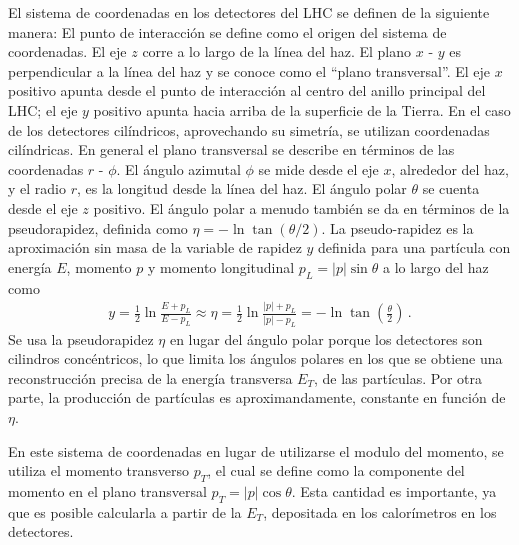 El sistema de coordenadas en los detectores del LHC se definen de la siguiente manera: 
El punto de interacción se define como el origen del sistema de coordenadas. El eje $z$ corre a lo largo de la línea del haz. El plano $x$ - $y$ es perpendicular a la línea del haz y se conoce como el \textquotedblleft plano transversal\textquotedblright. El eje $x$ positivo apunta desde el punto de interacción al centro del anillo principal del LHC; el eje $y$ positivo apunta hacia arriba de la superficie de la Tierra. En el caso de los detectores cilíndricos, aprovechando su simetría, se utilizan coordenadas cilíndricas. En general el plano transversal se describe en términos de las coordenadas $r$ - $\phi$. El ángulo azimutal $\phi$ se mide desde el eje $x$, alrededor del haz, y el radio $r$, es la longitud desde la línea del haz. El ángulo polar $\theta$ se cuenta desde el eje $z$ positivo. El ángulo polar a menudo también se da en términos de la pseudorapidez, definida como $\eta = -\ln \tan (\theta/2)$.
La pseudo-rapidez es la aproximación sin masa de la variable de rapidez $y$ definida para una partícula con energía $E$, momento $p$ y momento longitudinal $p_L = | p | \sin \theta$ a lo largo del haz como
%
\begin{align*}
y = \frac{1}{2}\ln \frac{E+p_L}{E-p_L} \approx \eta = \frac{1}{2}\ln \frac{|p|+p_L}{|p|-p_L} = -\ln \tan\left( \frac{\theta}{2} \right)\,.
\end{align*}
%
Se usa la pseudorapidez $\eta$ en lugar del ángulo polar porque los detectores son cilindros concéntricos, lo que limita los ángulos polares en los que se obtiene una reconstrucción precisa de la energía transversa $E_T$, de las partículas. Por otra parte, la producción de partículas es aproximandamente, constante en función de $\eta$.

En este sistema de coordenadas en lugar de utilizarse el modulo del momento, se utiliza el momento transverso $p_T$, el cual se define como la componente del momento en el plano transversal $p_T = | p | \cos \theta$. Esta cantidad es importante, ya que es posible calcularla a partir de la $E_T$, depositada en los calorímetros en los detectores.


